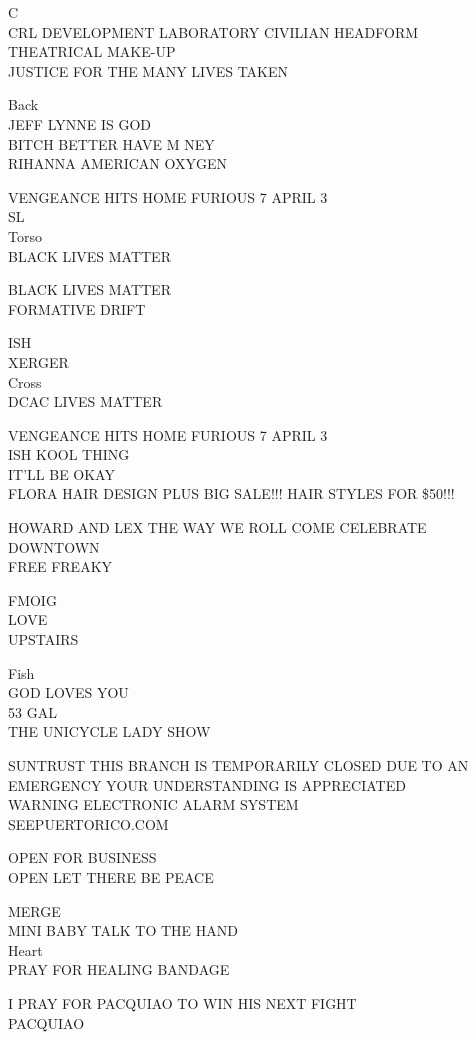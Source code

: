 \documentclass[10pt,letterpaper]{article}
\begin{document}
C\\
CRL DEVELOPMENT LABORATORY CIVILIAN HEADFORM\\
THEATRICAL MAKE{-}UP\\
JUSTICE FOR THE MANY LIVES TAKEN

Back\\
JEFF LYNNE IS GOD\\
BITCH BETTER HAVE M NEY\\
RIHANNA AMERICAN OXYGEN

VENGEANCE HITS HOME FURIOUS 7 APRIL 3\\
SL\\
Torso\\
BLACK LIVES MATTER

BLACK LIVES MATTER\\
FORMATIVE DRIFT

ISH\\
XERGER\\
Cross\\
DCAC LIVES MATTER

VENGEANCE HITS HOME FURIOUS 7 APRIL 3\\
ISH KOOL THING\\
IT'LL BE OKAY\\
FLORA HAIR DESIGN PLUS BIG SALE!!!  HAIR STYLES FOR \$50!!!

HOWARD AND LEX THE WAY WE ROLL COME CELEBRATE DOWNTOWN\\
FREE FREAKY

FMOIG\\
LOVE\\
UPSTAIRS

Fish\\
GOD LOVES YOU\\
53 GAL\\
THE UNICYCLE LADY SHOW

SUNTRUST THIS BRANCH IS TEMPORARILY CLOSED DUE TO AN EMERGENCY YOUR UNDERSTANDING IS APPRECIATED\\
WARNING ELECTRONIC ALARM SYSTEM\\
SEEPUERTORICO.COM

OPEN FOR BUSINESS\\
OPEN LET THERE BE PEACE

MERGE\\
MINI BABY TALK TO THE HAND\\
Heart\\
PRAY FOR HEALING BANDAGE

I PRAY FOR PACQUIAO TO WIN HIS NEXT FIGHT\\
PACQUIAO
\end{document}

